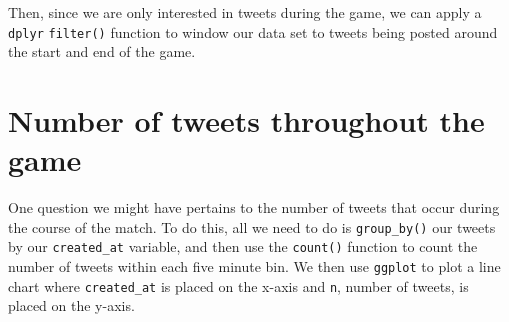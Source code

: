 \documentclass[
]{book}
\newenvironment{Shaded}{\begin{snugshade}}{\end{snugshade}}
\newcommand{\DataTypeTok}[1]{\textcolor[rgb]{0.13,0.29,0.53}{#1}}
\newcommand{\KeywordTok}[1]{\textcolor[rgb]{0.13,0.29,0.53}{\textbf{#1}}}
\newcommand{\NormalTok}[1]{#1}
\newcommand{\OperatorTok}[1]{\textcolor[rgb]{0.81,0.36,0.00}{\textbf{#1}}}
\newcommand{\StringTok}[1]{\textcolor[rgb]{0.31,0.60,0.02}{#1}}
\begin{document}
Then, since we are only interested in tweets during the game, we can apply a \texttt{dplyr} \texttt{filter()} function to window our data set to tweets being posted around the start and end of the game.

\begin{Shaded}
\end{Shaded}

\hypertarget{number-of-tweets-throughout-the-game}{%
\section{Number of tweets throughout the game}\label{number-of-tweets-throughout-the-game}}

One question we might have pertains to the number of tweets that occur during the course of the match. To do this, all we need to do is \texttt{group\_by()} our tweets by our \texttt{created\_at} variable, and then use the \texttt{count()} function to count the number of tweets within each five minute bin. We then use \texttt{ggplot} to plot a line chart where \texttt{created\_at} is placed on the x-axis and \texttt{n}, number of tweets, is placed on the y-axis.
\end{document}
